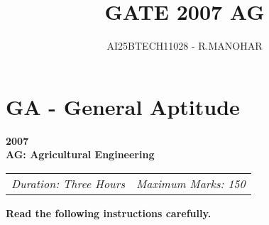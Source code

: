 \documentclass[journal,12pt,onecolumn]{IEEEtran}
\theoremstyle{remark}
\begin{document}
\title{GATE 2007 AG}
\author{AI25BTECH11028 - R.MANOHAR}
\maketitle
\renewcommand{\thefigure}{\theenumi}
\renewcommand{\thetable}{\theenumi}

\section*{GA - General Aptitude}


\begin{center}
{\large \textbf{2007}} \\[0.5em]
{\Large \textbf{AG: Agricultural Engineering}} \\[0.5em]
\end{center}

\noindent
\begin{tabular*}{\textwidth}{@{\extracolsep{\fill}}l r}
\textit{Duration: Three Hours} & \textit{Maximum Marks: 150} \\
\end{tabular*}


\begin{center}
\textbf{\large Read the following instructions carefully.}
\end{center}
\end{document}
